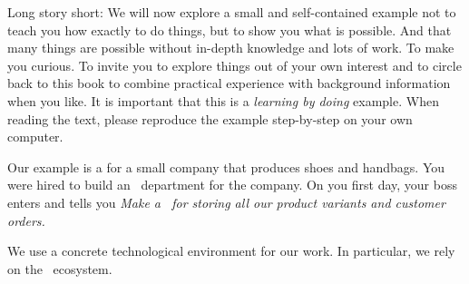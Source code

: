 Long story short:
We will now explore a small and self-contained example not to teach you how exactly to do things, but to show you what is possible.
And that many things are possible without in-depth knowledge and lots of work.
To make you curious.
To invite you to explore things out of your own interest and to circle back to this book to combine practical experience with background information when you like.
It is important that this is a \emph{learning by doing} example.
When reading the text, please reproduce the example step-by-step on your own computer.

Our example is a  for a small company that produces shoes and handbags.
You were hired to build an ~department for the company.
On you first day, your boss enters and tells you \emph{Make a \db\ for storing all our product variants and customer orders.}

We use a concrete technological environment for our work.
In particular, we rely on the \postgresql\ ecosystem.%
%
%
%
